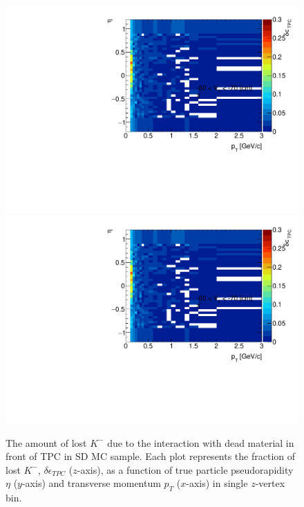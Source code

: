 \begin{figure}[H]
	\caption[The amount of lost $K^-$ due to the interaction with dead material in front of TPC as a function of $p_T$, $\eta$ and $z$-vertex in SD]{The amount of lost $K^-$ due to the interaction with dead material in front of TPC in SD MC sample. Each plot represents the fraction of lost $K^-$, $\delta\epsilon_{ TPC}$ ($z$-axis), as a function of true particle pseudorapidity $\eta$ ($y$-axis) and transverse momentum $p_{T}$ ($x$-axis) in single $z$-vertex bin.}\label{fig:dead_materialSD3DKm}
	\parbox{0.325\textwidth}{
		\includegraphics[width=\linewidth,page=17]{graphics/systematicsEfficiency/deadMaterial/secondaries_Unbinned_SD_.pdf}\\
		\includegraphics[width=\linewidth,page=20]{graphics/systematicsEfficiency/deadMaterial/secondaries_Unbinned_SD_.pdf}\\
}
\end{figure}
